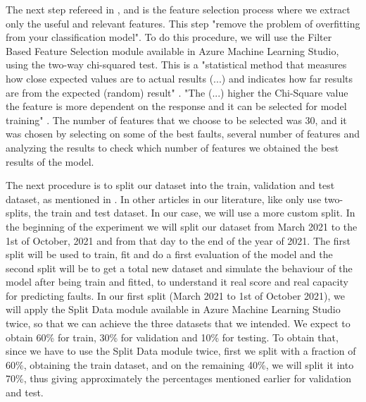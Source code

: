 The next step refereed in \cite{ML_Data_processing}, \cite{N_4_WIND} and \cite{39_WIND} is the feature selection process where we extract only the useful and relevant features. This step "remove the problem of overfitting from your classification model". To do this procedure, we will use the Filter Based Feature Selection module available in Azure Machine Learning Studio, using the two-way chi-squared test. This is a "statistical method that measures how close expected values are to actual results (...) and indicates how far results are from the expected (random) result" \cite{AZURE_MACHINE_LEARNING}. "The (...) higher the Chi-Square value the feature is more dependent on the response and it can be selected for model training" \cite{TDC_ChiSquared}. The number of features that we choose to be selected was 30, and it was chosen by selecting on some of the best faults, several number of features and analyzing the results to check which number of features we obtained the best results of the model.

The next procedure is to split our dataset into the train, validation and test dataset, as mentioned in \cite{TDC_Train_Test_Split} \cite{TDC_TrainValidationTest}. In other articles in our literature, like \cite{Machine_Learning_Mistery_Train-Test-Split} \cite{ML_Data_processing} \cite{N_4_WIND} \cite{41_WIND} only use two-splits, the train and test dataset.
In our case, we will use a more custom split. In the beginning of the experiment we will split our dataset from March 2021 to the 1st of October, 2021 and from that day to the end of the year of 2021. The first split will be used to train, fit and do a first evaluation of the model and the second split will be to get a total new dataset and simulate the behaviour of the model after being train and fitted, to understand it real score and real capacity for predicting faults.
In our first split (March 2021 to 1st of October 2021), we will apply the Split Data module available in Azure Machine Learning Studio twice, so that we can achieve the three datasets that we intended. We expect to obtain 60\% for train, 30\% for validation and 10\% for testing. To obtain that, since we have to use the Split Data module twice, first we split with a fraction of 60\%, obtaining the train dataset, and on the remaining 40\%, we will split it into 70\%, thus giving approximately the percentages mentioned earlier for validation and test.

